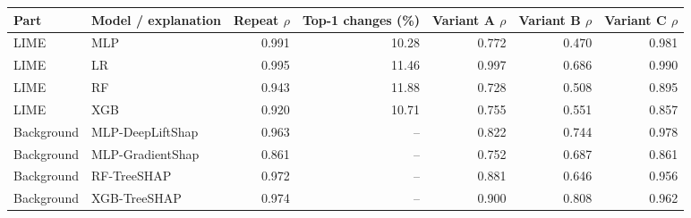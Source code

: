 \small
\begin{tabular}{llrrrrr}
\toprule
Part & Model / explanation & Repeat $\rho$ & Top-1 changes (\%) & Variant A $\rho$ & Variant B $\rho$ & Variant C $\rho$ \\
\midrule
LIME & MLP & 0.991 & 10.28 & 0.772 & 0.470 & 0.981 \\
LIME & LR & 0.995 & 11.46 & 0.997 & 0.686 & 0.990 \\
LIME & RF & 0.943 & 11.88 & 0.728 & 0.508 & 0.895 \\
LIME & XGB & 0.920 & 10.71 & 0.755 & 0.551 & 0.857 \\
Background & MLP-DeepLiftShap & 0.963 & -- & 0.822 & 0.744 & 0.978 \\
Background & MLP-GradientShap & 0.861 & -- & 0.752 & 0.687 & 0.861 \\
Background & RF-TreeSHAP & 0.972 & -- & 0.881 & 0.646 & 0.956 \\
Background & XGB-TreeSHAP & 0.974 & -- & 0.900 & 0.808 & 0.962 \\
\bottomrule
\end{tabular}
